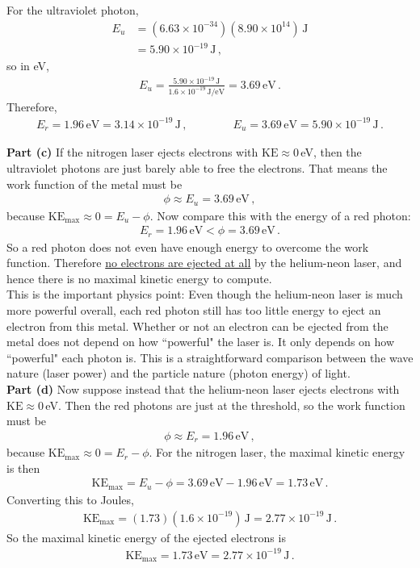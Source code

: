 \documentclass[11pt]{article}
\begin{document}
For the ultraviolet photon,
\begin{align*}
E_u &= (6.63\times 10^{-34})(8.90\times 10^{14})\,\text{J}\\
&= 5.90\times 10^{-19}\,\text{J}\,,
\end{align*}
so in eV,
\begin{align*}
E_u = \frac{5.90\times 10^{-19}\,\text{J}}{1.6\times 10^{-19}\,\text{J/eV}}
= 3.69\,\text{eV}\,.
\end{align*}
Therefore,
\begin{align*}
E_r = 1.96\,\text{eV} = 3.14\times 10^{-19}\,\text{J}\,,\qquad\qquad
E_u = 3.69\,\text{eV} = 5.90\times 10^{-19}\,\text{J}\,.
\end{align*}

\noindent\textbf{Part (c)} If the nitrogen laser ejects electrons with $\text{KE}\approx 0$\,eV, then the ultraviolet photons are just barely able to free the electrons. That means the work function of the metal must be
\begin{align*}
\phi \approx E_u = 3.69\,\text{eV}\,,
\end{align*}
because $\text{KE}_{\max} \approx 0 = E_u- \phi$. Now compare this with the energy of a red photon:
\begin{align*}
E_r = 1.96\,\text{eV} < \phi = 3.69\,\text{eV}\,.
\end{align*}
So a red photon does not even have enough energy to overcome the work function. Therefore \underline{no electrons are ejected at all} by the helium-neon laser, and hence there is no maximal kinetic energy to compute.\\

This is the important physics point: Even though the helium-neon laser is much more powerful overall, each red photon still has too little energy to eject an electron from this metal. Whether or not an electron can be ejected from the metal does not depend on how ``powerful" the laser is. It only depends on how ``powerful" each photon is. This is a straightforward comparison between the wave nature (laser power) and the particle nature (photon energy) of light.\\

\noindent\textbf{Part (d)} Now suppose instead that the helium-neon laser ejects electrons with $\text{KE}\approx 0$\,eV. Then the red photons are just at the threshold, so the work function must be
\begin{align*}
\phi \approx E_r = 1.96\,\text{eV}\,,
\end{align*}
because $\text{KE}_{\max} \approx 0 =E_r - \phi$. For the nitrogen laser, the maximal kinetic energy is then
\begin{align*}
\text{KE}_{\max} = E_u - \phi = 3.69\,\text{eV} - 1.96\,\text{eV} = 1.73\,\text{eV}\,.
\end{align*}
Converting this to Joules,
\begin{align*}
\text{KE}_{\max} = (1.73)(1.6\times 10^{-19})\,\text{J}
= 2.77\times 10^{-19}\,\text{J}\,.
\end{align*}
So the maximal kinetic energy of the ejected electrons is
\begin{align*}
\text{KE}_{\max} = 1.73\,\text{eV} = 2.77\times 10^{-19}\,\text{J}\,.
\end{align*}
\end{document}
